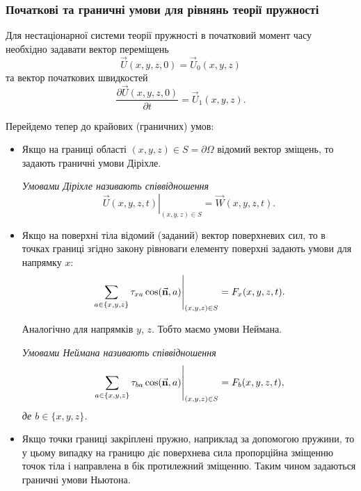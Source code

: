 \subsubsection{Початкові та граничні умови для рівнянь теорії пружності}

Для нестаціонарної системи теорії пружності в початковий момент часу необхідно задавати вектор переміщень
\begin{equation}
	\vec U(x, y, z, 0) = \vec U_0(x, y, z)
\end{equation}
та вектор початкових швидкостей
\begin{equation}
	\frac{\partial \vec U(x, y, z, 0)}{\partial t} = \vec U_1(x, y, z).
\end{equation}

Перейдемо тепер до крайових (граничних) умов:
\begin{itemize}
	\item Якщо на границі області $(x, y, z) \in S = \partial \Omega$ відомий вектор зміщень, то задають граничні умови Діріхле.

	\begin{definition}
		\it{Умовами Діріхле} називають співвідношення
		\begin{equation}
			\left. \vec U(x, y, z, t) \right|_{(x, y, z) \in S} = \vec W(x, y, z, t).
		\end{equation}
	\end{definition}

	\item Якщо на поверхні тіла відомий (заданий) вектор поверхневих сил, то в точках границі згідно закону рівноваги елементу поверхні задають умови для напрямку $x$:
	\begin{equation}
		\left. \displaystyle\sum\limits_{a \in \{x, y, z\}} \tau_{x a}\cos(\vec{\textbf{n}}, a) \right|_{(x, y, z) \in S} = F_x(x, y, z, t).
	\end{equation}

	Аналогічно для напрямків $y$, $z$. Тобто маємо умови Неймана.

	\begin{definition}
		\it{Умовами Неймана} називають співвідношення
		\begin{equation}
			\left. \displaystyle\sum\limits_{a \in \{x, y, z\}} \tau_{b a} \cos(\vec{\textbf{n}}, a) \right|_{(x, y, z) \in S} = F_b(x, y, z, t),
		\end{equation}
		 де $b \in \{x, y, z\}$.
	\end{definition}

	\item Якщо точки границі закріплені пружно, наприклад за допомогою пружини, то у цьому випадку на границю діє поверхнева сила пропорційна зміщенню точок тіла і направлена в бік протилежний зміщенню. Таким чином задаються граничні умови Ньютона.


\end{itemize}
